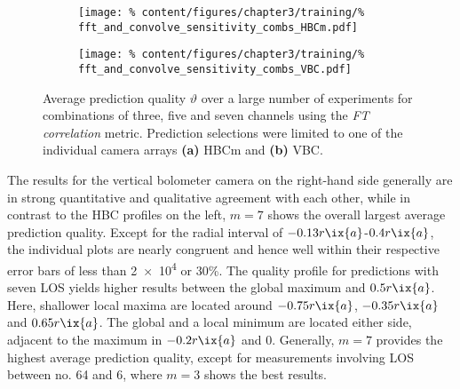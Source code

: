 %
            \begin{figure}[t]%
                \centering%
                \begin{subfigure}{0.47\textwidth}%
                    \texttt{[image: \%
                        content/figures/chapter3/training/\%
                        fft\_and\_convolve\_sensitivity\_combs\_HBCm.pdf]}%
                    \caption{}%
                \end{subfigure}%
                \hfill%
                \begin{subfigure}{0.47\textwidth}%
                    \texttt{[image: \%
                        content/figures/chapter3/training/\%
                        fft\_and\_convolve\_sensitivity\_combs\_VBC.pdf]}%
                    \caption{}%
                \end{subfigure}%
                \caption{Average prediction quality $\vartheta$ over a large number of experiments for combinations of three, five and seven channels using the \textit{FT correlation} metric. Prediction selections were limited to one of the individual camera arrays \textbf{(a)} HBCm and \textbf{(b)} VBC.}\label{fig:results_fourier_correlation}%
            \end{figure}%
%
            The results for the vertical bolometer camera on the right-hand side generally are in strong quantitative and qualitative agreement with each other, while in contrast to the HBC profiles on the left, $m=7$ shows the overall largest average prediction quality. Except for the radial interval of $-0.13r\ix{a}$-$0.4r\ix{a}$, the individual plots are nearly congruent and hence well within their respective error bars of less than \SI{2e4}{\arbitraryunit} or 30\%. The quality profile for predictions with seven LOS yields higher results between the global maximum and $0.5r\ix{a}$. Here, shallower local maxima are located around $-0.75r\ix{a}$, $-0.35r\ix{a}$ and $0.65r\ix{a}$. The global and a local minimum are located either side, adjacent to the maximum in $-0.2r\ix{a}$ and $0$. Generally, $m=7$ provides the highest average prediction quality, except for measurements involving LOS between no. 64 and 6, where $m=3$ shows the best results.\\%
